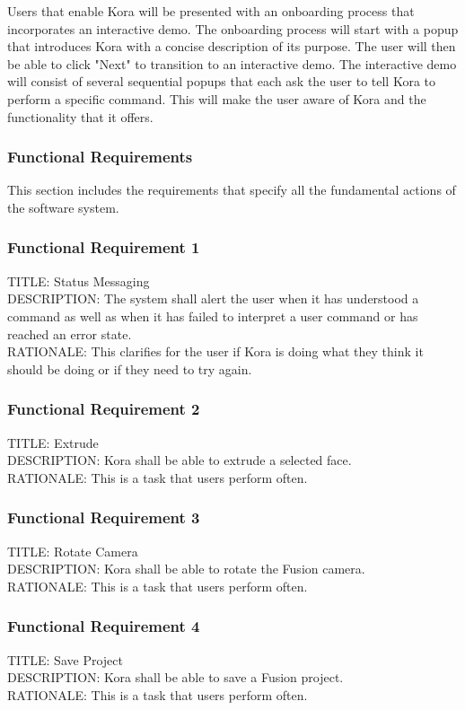 \documentclass[onecolumn, draftclsnofoot,10pt, compsoc]{IEEEtran}
\def \botname{Kora\xspace}
\begin{document}
	Users that enable \botname will be presented with an onboarding process that incorporates an interactive demo.
	The onboarding process will start with a popup that introduces \botname with a concise description of its purpose.
	The user will then be able to click "Next" to transition to an interactive demo.
	The interactive demo will consist of several sequential popups that each ask the user to tell \botname to perform a specific command.
	This will make the user aware of \botname and the functionality that it offers.

	\subsubsection{Functional Requirements}
	This section includes the requirements that specify all the fundamental actions of the software system.
	\subsubsection{Functional Requirement 1}
	TITLE: Status Messaging \\
	DESCRIPTION: The system shall alert the user when it has understood a command as well as when it has failed to interpret a user command or has reached an error state. \\
	RATIONALE: This clarifies for the user if \botname is doing what they think it should be doing or if they need to try again.

	\subsubsection{Functional Requirement 2}
	TITLE: Extrude \\
	DESCRIPTION: \botname shall be able to extrude a selected face. \\
	RATIONALE: This is a task that users perform often.

	\subsubsection{Functional Requirement 3}
	TITLE: Rotate Camera \\
	DESCRIPTION: \botname shall be able to rotate the Fusion camera. \\
	RATIONALE: This is a task that users perform often.

	\subsubsection{Functional Requirement 4}
	TITLE: Save Project \\
	DESCRIPTION: \botname shall be able to save a Fusion project. \\
	RATIONALE: This is a task that users perform often.
\end{document}
